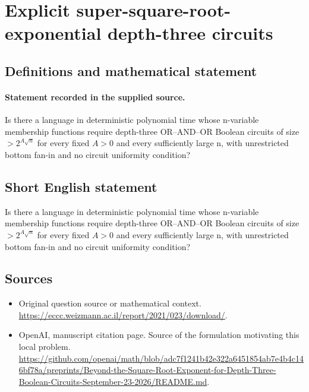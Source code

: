 \documentclass[11pt]{article}
\begin{document}
\section*{Explicit super-square-root-exponential depth-three circuits}\label{statement}
\subsection{Definitions and mathematical statement}
\paragraph{Statement recorded in the supplied source.}
Is there a language in deterministic polynomial time whose n-variable membership functions require depth-three OR–AND–OR Boolean circuits of size $>2^{A\surd n}$ for every fixed $A>0$ and every sufficiently large n, with unrestricted bottom fan-in and no circuit uniformity condition?
\subsection{Short English statement}
Is there a language in deterministic polynomial time whose n-variable membership functions require depth-three OR–AND–OR Boolean circuits of size $>2^{A\surd n}$ for every fixed $A>0$ and every sufficiently large n, with unrestricted bottom fan-in and no circuit uniformity condition?
\subsection{Sources}
\begin{itemize}
\item[S1] Original question source or mathematical context.
\url{https://eccc.weizmann.ac.il/report/2021/023/download/}.
\item[S2] OpenAI, manuscript citation page. Source of the formulation motivating this local problem.
\url{https://github.com/openai/math/blob/adc7f1241b42e322a6451854ab7e4b4c146bf78a/preprints/Beyond-the-Square-Root-Exponent-for-Depth-Three-Boolean-Circuits-September-23-2026/README.md}.
\end{itemize}
\end{document}
